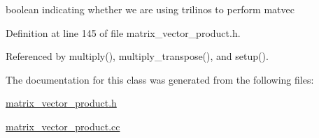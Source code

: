 boolean indicating whether we are using trilinos to perform matvec 



Definition at line 145 of file matrix\+\_\+vector\+\_\+product.\+h.



Referenced by multiply(), multiply\+\_\+transpose(), and setup().



The documentation for this class was generated from the following files\+:\begin{DoxyCompactItemize}
\item 
\hyperlink{matrix__vector__product_8h}{matrix\+\_\+vector\+\_\+product.\+h}\item 
\hyperlink{matrix__vector__product_8cc}{matrix\+\_\+vector\+\_\+product.\+cc}\end{DoxyCompactItemize}
